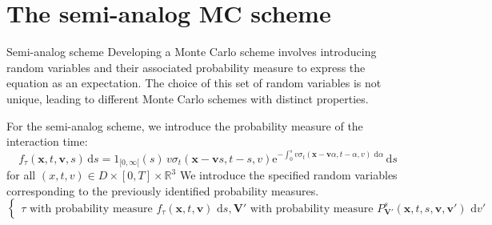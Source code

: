 \documentclass[aspectratio=1610]{beamer}
\newcommand{\bm}[1]{\symbf{#1}}
\newcommand{\di}{\ensuremath{\, \mathrm{d}}}
\newcommand{\e}{\ensuremath{\mathrm{e}}}
\def\\{}%
\begin{document}
\section{The semi-analog MC scheme}

\begin{frame}{Semi-analog scheme}
    Developing a Monte Carlo scheme involves introducing random variables and their associated probability measure to express the equation as an expectation. The choice of this set of random variables is not unique, leading to different Monte Carlo schemes with distinct properties.

    For the semi-analog scheme, we introduce the probability measure of the interaction time: 
    \begin{equation*}
    f_{\tau}(\bm{x}, t, \bm{v}, s) \di s = 1_{[0,\infty[}(s) \, v\sigma_t(\bm{x} - \bm{v}s, t - s, v) \e^{-\int_{0}^s v\sigma_t(\bm{x} - \bm{v}\alpha, t - \alpha, v) \, \di \alpha} \di s
    \end{equation*}
    for all $(x, t, v) \in D \times [0, T] \times \mathbb{R}^3$\\
    We introduce the specified random variables corresponding to the previously identified probability measures.
    \begin{equation*}
        \left\{
            \begin{array}{ll}
                \tau \text{ with probability measure } f_{\tau}(\bm{x}, t, \bm{v}) \, \di s, \\
                \bm{V}' \text{ with probability measure } P_{\bm{V}'}^{s}(\bm{x}, t, s, \bm{v}, \bm{v}') \, \di v'
            \end{array}
        \right.
    \end{equation*}

\end{frame}
\end{document}
